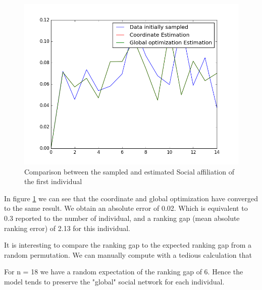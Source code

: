 \documentclass[12pt]{ociamthesis}  %
\begin{document}
	\begin{figure}
		\centering
		\includegraphics[width=\textwidth,height=\textheight,keepaspectratio]{LambdaEstimation}
		\caption{Comparison between the sampled and estimated Social affiliation of the first individual}
		\label{label-image1}
	\end{figure}
	
	In figure \ref{label-image1} we can see that the coordinate and global optimization have converged to the same result. We obtain an absolute error of 0.02. Which is equivalent to 0.3 reported to the number of individual, and a ranking gap (mean absolute ranking error) of 2.13 for this individual.
	
	It is interesting to compare the ranking gap to the expected ranking gap from a random permutation. We can manually compute with a tedious calculation that
	\begin{center}
	\end{center}
	
	For n = 18 we have a random expectation of the ranking gap of 6. Hence the model tends to preserve the "global" social network for each individual.
	
\end{document}
